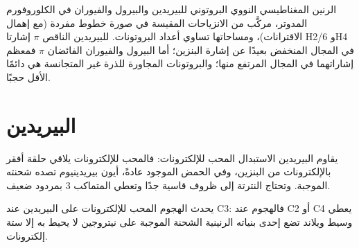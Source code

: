 \begin{omfigure}

{\small الرنين المغناطيسي النووي البروتوني للبيريدين والبيرول والفيوران في الكلوروفورم المدوتر،
مركَّب من الانزياحات المقيسة في صورة خطوط مفردة (مع إهمال الاقترانات)، 
ومساحاتها تساوي أعداد البروتونات. للبيريدين الناقص $\pi$ إشارتا H2/6 وH4
في المجال المنخفض بعيدًا عن إشارة البنزين؛ أما البيرول والفيوران الفائضان $\pi$ فمعظم
إشاراتهما في المجال المرتفع منها؛ والبروتونات المجاورة للذرة غير المتجانسة هي دائمًا الأقل
حجبًا.}
\end{omfigure}

\section{البيريدين}

يقاوم البيريدين الاستبدال المحب للإلكترونات: فالمحب للإلكترونات يلاقي حلقة
أفقر بالإلكترونات من البنزين، وفي الحمض الموجود عادةً، أيون
بيريدينيوم تصده شحنته الموجبة. وتحتاج النترتة إلى ظروف
قاسية جدًا وتعطي المتماكب 3 بمردود ضعيف.

\begin{proposition}\label{prop:b3:heterocycles:pyridine-c3}
يحدث الهجوم المحب للإلكترونات على البيريدين عند C3: فالهجوم عند C2 أو C4 يعطي
وسيط ويلاند تضع إحدى بنياته الرنينية الشحنة الموجبة
على نيتروجين لا يحيط به إلا ستة إلكترونات.
\end{proposition}

